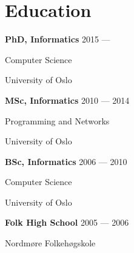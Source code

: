 \section{Education}
\parbox[t][][t]{\linewidth}{
	\parbox{\linewidth}{\textbf{PhD, Informatics} \hfill {{2015 --- \phantom{2018}}}}
	\parbox{\linewidth}{{Computer Science}}
	\parbox{\linewidth}{{University of Oslo}}
	\smallskip
}

\parbox[t][][t]{\linewidth}{
	\parbox{\linewidth}{\textbf{MSc, Informatics} \hfill {{2010 --- 2014}}}
	\parbox{\linewidth}{{Programming and Networks}}
	\parbox{\linewidth}{{University of Oslo}}
	\smallskip
}

\parbox[t][][t]{\linewidth}{
	\parbox{\linewidth}{\textbf{BSc, Informatics} \hfill {{2006 --- 2010}}}
	\parbox{\linewidth}{{Computer Science}}
	\parbox{\linewidth}{{University of Oslo}}
	\smallskip
}

\parbox[t][][t]{\linewidth}{
	\parbox{\linewidth}{\textbf{Folk High School} \hfill{{2005 --- 2006}}}
	\parbox{\linewidth}{Nordmøre Folkehøgskole}
	\smallskip
}

